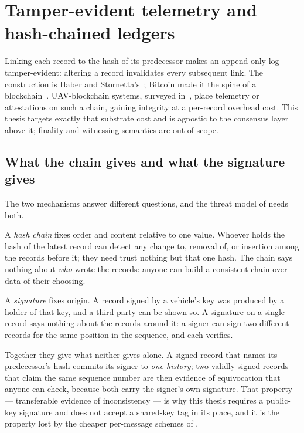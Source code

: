 \section{Tamper-evident telemetry and hash-chained ledgers}

Linking each record to the hash of its predecessor makes an append-only log tamper-evident:
altering a record invalidates every subsequent link. The construction is Haber and
Stornetta's~\cite{haber1991timestamp}; Bitcoin made it the spine of a
blockchain~\cite{nakamoto2008}. UAV-blockchain systems, surveyed
in~\cite{mehta2020blockchainuav}, place telemetry or attestations on such a chain, gaining
integrity at a per-record overhead cost. This thesis targets exactly that substrate cost and is
agnostic to the consensus layer above it; finality and witnessing semantics are out of scope.

\subsection{What the chain gives and what the signature gives}

The two mechanisms answer different questions, and the threat model of 
needs both.

A \emph{hash chain} fixes order and content relative to one value. Whoever holds the hash of the
latest record can detect any change to, removal of, or insertion among the records before it;
they need trust nothing but that one hash. The chain says nothing about \emph{who} wrote the
records: anyone can build a consistent chain over data of their choosing.

A \emph{signature} fixes origin. A record signed by a vehicle's key was produced by a holder of
that key, and a third party can be shown so. A signature on a single record says nothing about
the records around it: a signer can sign two different records for the same position in the
sequence, and each verifies.

Together they give what neither gives alone. A signed record that names its predecessor's hash
commits its signer to \emph{one history}; two validly signed records that claim the same
sequence number are then evidence of equivocation that anyone can check, because both carry the
signer's own signature. That property --- transferable evidence of inconsistency --- is why this
thesis requires a public-key signature and does not accept a shared-key tag in its place, and it
is the property lost by the cheaper per-message schemes of .

